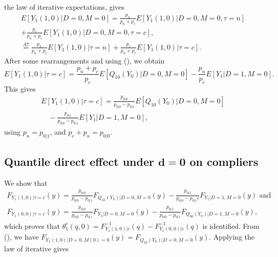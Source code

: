 \documentclass[a4paper,12pt]{article}
\begin{document}
 \doublespacing \pagestyle{plain}
the law of iterative expectations, gives
\begin{align*}
E[Y_1(1,0)|D=0,M=0] = \frac{p_n}{p_n+p_c} E[Y_1(1,0)|D=0,M=0, \tau=n] \\+ \frac{p_c}{p_n+p_c}E[Y_1(1,0)|D=0,M=0,\tau= c], \\
\stackrel{A7}{=} \frac{p_n}{p_n+ p_c} E[Y_1(1,0)|\tau=n] + \frac{p_c}{p_n+p_c}E[Y_1(1,0)|\tau= c].
\end{align*}
After some rearrangements and using (), we obtain
\begin{equation*}
E[Y_1(1,0)|\tau= c]  = \frac{p_n+p_c}{p_c} E[Q_{10}(Y_0)|D=0,M=0] -   \frac{p_n}{p_c} E[Y_1|D=1,M=0].
\end{equation*}
This gives
\begin{equation} 
\begin{array}{rl}
E[Y_1(1,0)|\tau=c] =  \displaystyle \frac{p_{0|0}}{p_{0|0} - p_{0|1}}E[Q_{10}(Y_0)|D=0,M=0] \\  \displaystyle \quad  - \frac{p_{0|1}}{p_{0|0} - p_{0|1}}E[Y_1|D=1,M=0],
\end{array}
\end{equation}
using $p_n = p_{0|1}$, and $p_c +p_n = p_{0|0}$.
\subsection{Quantile direct effect under $\mathbf{d = 0}$ on compliers}
We show that
\begin{align*}
 F_{Y_{1}(1,0)|\tau=c}(y) = \frac{p_{0|0}}{p_{0|0} - p_{0|1}}  F_{Q_{10}(Y_{0})|D=0,M=0}(y) - \frac{p_{0|1}}{ p_{0|0} - p_{0|1}c}  F_{Y_1|D=1,M=0}(y) \mbox{ and} \\
F_{Y_{1}(0,0)|\tau=c}(y) = \frac{p_{0|0}}{p_{0|0} - p_{0|1}} F_{Y_{1}|D=0,M=0}(y) - \frac{p_{0|1} }{p_{0|0} - p_{0|1}}F_{Q_{00}(Y_{0})|D=1,M=0}(y)  ,
\end{align*}
which proves that $\theta_1^{c}(q,0) = F_{Y_{1}(1,0)|c}^{-1}(q)-F_{Y_{1}(0,0)|c}^{-1}(q)$ is identified.
From (), we have $F_{Y_{1}(1,0)|D=0,M(0)=0}(y)   = F_{Q_{10}(Y_{0})|D=0,M=0}(y)$.
Applying the law of iterative gives
\end{document}
